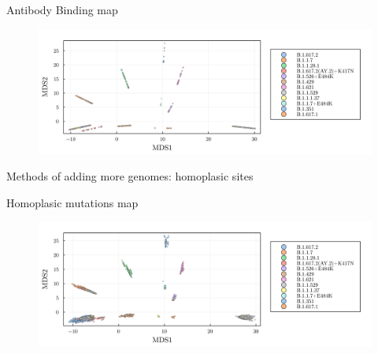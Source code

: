 \documentclass{beamer}
\begin{document}
\begin{frame}{Antibody Binding map}
    \begin{figure}
        \centering
        \includegraphics[width=1.1\textwidth]{my_figs/binding_usa_multidimensional_scaling.png}
    \end{figure}
\end{frame}

\begin{frame}{Methods of adding more genomes: homoplasic sites}
    \begin{figure}
        \centering
        \scalebox{1.1}{
        
        }
    \end{figure}
    \centering
    \vfill
    \tiny{\cite{page2009molecular}}
\end{frame}

\begin{frame}{Homoplasic mutations map}
    \begin{figure}
        \centering

        \includegraphics[width=1.1\textwidth]{my_figs/homoplasy_usa_multidimensional_scaling.png}
    \end{figure}
\end{frame}
\end{document}
